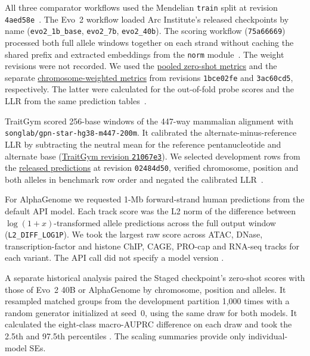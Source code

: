 \documentclass[a4paper,num-refs]{oup-contemporary}
\begin{document}
All three comparator workflows used the Mendelian \texttt{train} split at revision \texttt{4aed58e}~\citep{mendeliancard}.
The Evo~2 workflow loaded Arc Institute's released checkpoints by name
(\texttt{evo2\_1b\_base}, \texttt{evo2\_7b}, \texttt{evo2\_40b}).
The scoring workflow (\texttt{75a66669}) processed both full allele windows
together on each strand without caching the shared prefix and extracted
embeddings from the \texttt{norm} module~\citep{marindnaevo2code}.
The weight revisions were not recorded.
We used the \href{https://gist.github.com/gonzalobenegas/3649e68fb63ca1f3443e4486078eb4d8/1bce02fe0d831382d24ecbac305d401f153c65fc}{pooled zero-shot metrics}
and the separate \href{https://gist.github.com/gonzalobenegas/3649e68fb63ca1f3443e4486078eb4d8/3ac60cd5e37148fd135c4d55bed12386dc065dc6}{chromosome-weighted metrics}
from revisions \texttt{1bce02fe} and \texttt{3ac60cd5}, respectively.
The latter were calculated for the out-of-fold probe scores and the LLR
from the same prediction tables~\citep{marindnaevo2metrics}.

TraitGym scored 256-base windows of the 447-way mammalian alignment
with \texttt{songlab/gpn-star-hg38-m447-200m}. It calibrated the
alternate-minus-reference LLR by subtracting the neutral mean for the
reference pentanucleotide and alternate base
(\href{https://github.com/songlab-cal/TraitGym/blob/21067e3402e69822c6c520be2c0a1ccac15a390b/eval/workflow/rules/gpn_star.smk}{TraitGym revision \texttt{21067e3}}).
We selected development rows from the
\href{https://gist.github.com/gonzalobenegas/db282f89aa00244fbb7437dce0f069ef/02484d50d9bfd80337e313652b26f98a9362b6b1}{released predictions}
at revision \texttt{02484d50}, verified chromosome, position and both
alleles in benchmark row order and negated the calibrated LLR~\citep{marindnagpnworkflow}.

For AlphaGenome we requested 1-Mb forward-strand human predictions
from the default API model. Each track score was the L2 norm of the difference between
$\log(1+x)$-transformed allele predictions across the full output window
(\texttt{L2\_DIFF\_LOG1P}). We took the largest raw score across ATAC,
DNase, transcription-factor and histone ChIP, CAGE, PRO-cap and RNA-seq
tracks for each variant. The API call did not specify a model version
\citep{marindnaagworkflow}.

A separate historical analysis paired the Staged checkpoint's zero-shot
scores with those of Evo~2 40B or AlphaGenome by chromosome, position
and alleles. It resampled matched groups from the development partition
1,000 times with a random generator initialized at seed~0, using the
same draw for both models. It calculated the eight-class macro-AUPRC
difference on each draw and took the 2.5th and 97.5th percentiles
\citep{marindnapaired}. The scaling summaries provide only individual-model SEs.
\end{document}
